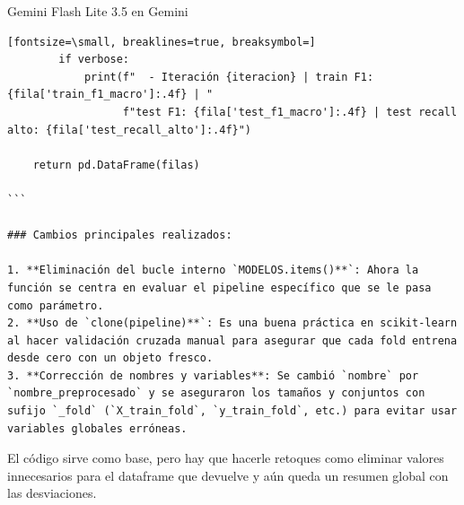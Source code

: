\documentclass[12pt,a4paper,oneside]{book}
\begin{document}
\begin{iaresp}{Gemini Flash Lite 3.5 en Gemini}
\begin{Verbatim}[fontsize=\small, breaklines=true, breaksymbol=]
        if verbose:
            print(f"  - Iteración {iteracion} | train F1: {fila['train_f1_macro']:.4f} | "
                  f"test F1: {fila['test_f1_macro']:.4f} | test recall alto: {fila['test_recall_alto']:.4f}")
                  
    return pd.DataFrame(filas)

```

### Cambios principales realizados:

1. **Eliminación del bucle interno `MODELOS.items()**`: Ahora la función se centra en evaluar el pipeline específico que se le pasa como parámetro.
2. **Uso de `clone(pipeline)**`: Es una buena práctica en scikit-learn al hacer validación cruzada manual para asegurar que cada fold entrena desde cero con un objeto fresco.
3. **Corrección de nombres y variables**: Se cambió `nombre` por `nombre_preprocesado` y se aseguraron los tamaños y conjuntos con sufijo `_fold` (`X_train_fold`, `y_train_fold`, etc.) para evitar usar variables globales erróneas.
\end{Verbatim}
\end{iaresp}
\begin{iaanalisis}
El código sirve como base, pero hay que hacerle retoques como eliminar valores innecesarios para el dataframe que devuelve y aún queda un resumen global con las desviaciones.
\end{iaanalisis}
\end{document}
